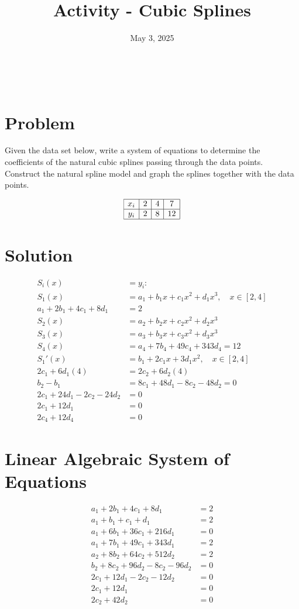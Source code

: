 \documentclass[legalpaper,11pt,extrafontsizes,oneside,openany,x11names]{memoir}
\title{Activity - Cubic Splines}
\date{May 3, 2025}
\makeatletter
\def\maketitle{
    \begin{center}
        \LARGE \textbf{\@title} \\[0.5ex]
        \large \@date
    \end{center}
}
\makeatother
\begin{document}
\maketitle

\section*{Problem}

Given the data set below, write a system of equations to determine the coefficients of the natural cubic splines passing through the data points. Construct the natural spline model and graph the splines together with the data points.

\[
\begin{array}{|c|c|c|c|}
\hline
x_i & 2 & 4 & 7 \\
\hline
y_i & 2 & 8 & 12 \\
\hline
\end{array}
\]

\section*{Solution}

\[
\begin{aligned}
S_i(x) &= y_i : \\
S_1(x) &= a_1 + b_1x + c_1x^2 + d_1x^3, \quad x \in [2,4] \\
a_1 + 2b_1 + 4c_1 + 8d_1 &= 2 \\
S_2(x) &= a_2 + b_2x + c_2x^2 + d_2x^3 \\
S_3(x) &= a_3 + b_3x + c_3x^2 + d_3x^3 \\
S_4(x) &= a_4 + 7b_4 + 49c_4 + 343d_4 = 12 \\
S_1'(x) &= b_1 + 2c_1x + 3d_1x^2, \quad x \in [2,4] \\
2c_1 + 6d_1(4) &= 2c_2 + 6d_2(4) \\
b_2 - b_1 &= 8c_1 + 48d_1 - 8c_2 - 48d_2 = 0 \\
2c_1 + 24d_1 - 2c_2 - 24d_2 &= 0 \\
2c_1 + 12d_1 &= 0 \\
2c_4 + 12d_4 &= 0
\end{aligned}
\]

\section*{Linear Algebraic System of Equations}

\[
\begin{aligned}
a_1 + 2b_1 + 4c_1 + 8d_1 &= 2 \\
a_1 + b_1 + c_1 + d_1 &= 2 \\
a_1 + 6b_1 + 36c_1 + 216d_1 &= 0 \\
a_1 + 7b_1 + 49c_1 + 343d_1 &= 2 \\
a_2 + 8b_2 + 64c_2 + 512d_2 &= 2 \\
b_2 + 8c_2 + 96d_2 - 8c_2 - 96d_2 &= 0 \\
2c_1 + 12d_1 - 2c_2 - 12d_2 &= 0 \\
2c_1 + 12d_1 &= 0 \\
2c_2 + 42d_2 &= 0
\end{aligned}
\]
\end{document}
